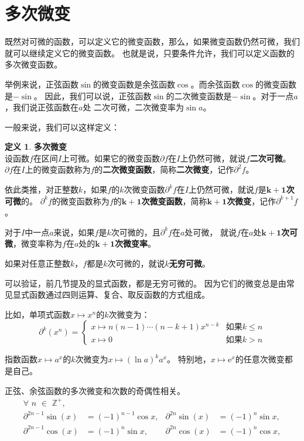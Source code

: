 \documentclass[12pt,UTF8]{ctexbook}
\theoremstyle{definition}
\newtheorem{df}{定义}[section]
\theoremstyle{plain}
\begin{document}
\section{多次微变}
既然对可微的函数，可以定义它的微变函数，那么，如果微变函数仍然可微，我们就可以继续定义它的微变函数。
也就是说，只要条件允许，我们可以定义函数的多次微变函数。

举例来说，正弦函数$\sin$的微变函数是余弦函数$\cos$。而余弦函数$\cos$的微变函数是$-\sin$。
因此，我们可以说，正弦函数$\sin$的二次微变函数是$-\sin$。对于一点$a$，我们说正弦函数在$a$处
二次可微，二次微变率为$\sin{a}$。

一般来说，我们可以这样定义：
\begin{df}{\textbf{多次微变}}
    \mbox{} \\
    设函数$f$在区间$I$上可微。如果它的微变函数$\partial f$在$I$上仍然可微，就说$f$\textbf{二次可微}。
    $\partial f$在$I$上的微变函数称为$f$的\textbf{二次微变函数}，简称\textbf{二次微变}，记作$\partial^2 f$。
    
    依此类推，对正整数$k$，如果$f$的$k$次微变函数$\partial^k f$在$I$上仍然可微，就说$f$是$\boldsymbol{k+1}$\textbf{次可微}的。
    $\partial^k f$的微变函数称为$f$的$\boldsymbol{k+1}$\textbf{次微变函数}，简称$\boldsymbol{k+1}$\textbf{次微变}，记作$\partial^{k+1} f$。

    对于$I$中一点$a$来说，如果$f$是$k$次可微的，且$\partial^k f$在$a$处可微，
    就说$f$在$a$处$\boldsymbol{k+1}$\textbf{次可微}，微变率称为$f$在$a$处的$\boldsymbol{k+1}$\textbf{次微变率}。

    如果对任意正整数$k$，$f$都是$k$次可微的，就说$k$\textbf{无穷可微}。
\end{df}

可以验证，前几节提及的显式函数，都是无穷可微的。
因为它们的微变总是由常见显式函数通过四则运算、复合、取反函数的方式组成。

比如，单项式函数$x\mapsto x^n$的$k$次微变为：
$$ \partial^k (x^n) = \left\{
    \begin{array}{ll}
        x\mapsto n(n-1)\cdots(n-k+1) x^{n-k} & \mbox{如果} k \leqslant n \\
        x\mapsto 0 & \mbox{如果} k > n
    \end{array}\right.
$$

指数函数$x\mapsto a^x$的$k$次微变为$x\mapsto (\ln{a})^k a^x$。
特别地，$x\mapsto \mathrm{e}^x$的任意次微变都是自己。

正弦、余弦函数的多次微变和次数的奇偶性相关。
\begin{align*}
    \forall \,\,n\,\,\in\,\,\mathbb{Z}^+, \\
    \partial^{2n-1} \sin(x) &= (-1)^{n-1} \cos{x}, & \partial^{2n} \sin(x) &= (-1)^{n} \sin{x},  \\
    \partial^{2n-1} \cos(x) &= (-1)^{n} \sin{x}, & \partial^{2n} \cos(x) &= (-1)^{n} \cos{x},  
\end{align*}
\end{document}
